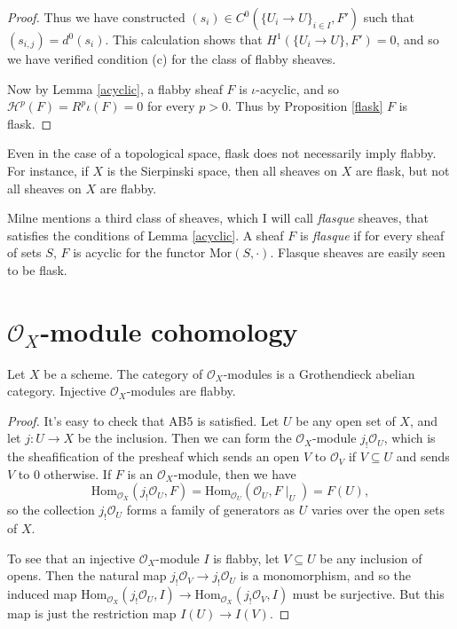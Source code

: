 \begin{proof}
Thus we have constructed $(s_i)\in C^0(\{U_i \rightarrow U\}_{i\in I}, F')$ such that $(s_{i,j}) = d^0(s_i)$. This calculation shows that $H^1(\{U_i\rightarrow U\}, F') = 0$, and so we have verified condition (c) for the class of flabby sheaves.

Now by Lemma \ref{acyclic}, a flabby sheaf $F$ is $\iota$-acyclic, and so $\mathcal{H}^p(F) = R^p\iota(F) = 0$ for every $p > 0$. Thus by Proposition \ref{flask} $F$ is flask.
\end{proof}

\begin{rem} Even in the case of a topological space, flask does not necessarily imply flabby. For instance, if $X$ is the Sierpinski space, then all sheaves on $X$ are flask, but not all sheaves on $X$ are flabby.
\end{rem}

\begin{rem} Milne \cite{milne} mentions a third class of sheaves, which I will call \emph{flasque} sheaves, that satisfies the conditions of Lemma \ref{acyclic}. A sheaf $F$ is \emph{flasque} if for every sheaf of sets $S$, $F$ is acyclic for the functor $\mbox{Mor}(S,\cdot)$. Flasque sheaves are easily seen to be flask.
\end{rem}

\section{$\mathcal{O}_X$-module cohomology}

\begin{prop} Let $X$ be a scheme. The category of $\mathcal{O}_X$-modules is a Grothendieck abelian category. Injective $\mathcal{O}_X$-modules are flabby.
\end{prop}
\begin{proof} It's easy to check that AB5 is satisfied. Let $U$ be any open set of $X$, and let $j:U\rightarrow X$ be the inclusion. Then we can form the $\mathcal{O}_X$-module $j_!\mathcal{O}_U$, which is the sheafification of the presheaf which sends an open $V$ to $\mathcal{O}_V$ if $V\subseteq U$ and sends $V$ to $0$ otherwise. If $F$ is an $\mathcal{O}_X$-module, then we have
\[
\mbox{Hom}_{\mathcal{O}_X}(j_!\mathcal{O}_U, F) = \mbox{Hom}_{\mathcal{O}_U}(\mathcal{O}_U, F\mid_U) = F(U),
\]
so the collection $j_!\mathcal{O}_U$ forms a family of generators as $U$ varies over the open sets of $X$.

To see that an injective $\mathcal{O}_X$-module $I$ is flabby, let $V\subseteq U$ be any inclusion of opens. Then the natural map $j_!\mathcal{O}_V \rightarrow j_!\mathcal{O}_U$ is a monomorphism, and so the induced map $\mbox{Hom}_{\mathcal{O}_X}(j_!\mathcal{O}_U, I) \rightarrow \mbox{Hom}_{\mathcal{O}_X}(j_!\mathcal{O}_V, I)$ must be surjective. But this map is just the restriction map $I(U) \rightarrow I(V)$.
\end{proof}

